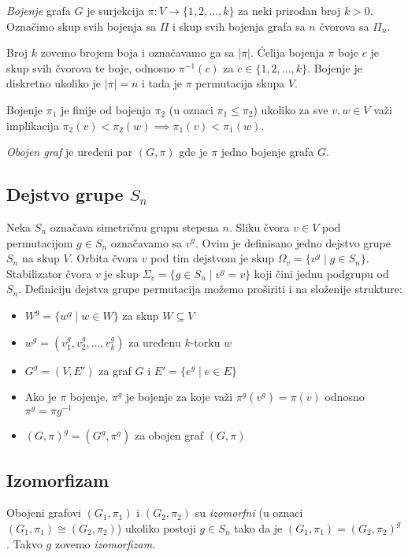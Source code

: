 \documentclass[12pt,oneside]{memoir}
\theoremstyle{definition}
\begin{document}
   \emph{Bojenje} grafa $G$ je surjekcija $\pi : V \to \{1, 2, \dots, k\}$ za
   neki prirodan broj $k > 0$. Označimo skup svih bojenja sa $\Pi$ i skup svih
   bojenja grafa sa $n$ čvorova sa $\Pi_n$.

   Broj $k$ zovemo brojem boja i označavamo ga sa $|\pi|$.  Ćelija bojenja $\pi$
   boje $c$ je skup svih čvorova te boje, odnosno $\pi^{-1}(c)$ za $c \in \{1,
   2, ..., k\}$.  Bojenje je diskretno ukoliko je $|\pi| = n$ i tada je $\pi$
   permutacija skupa $V$.

   Bojenje $\pi_1$ je finije od bojenja $\pi_2$ (u oznaci $\pi_1 \leq \pi_2$)
   ukoliko za sve $v, w \in V$ važi implikacija $\pi_2(v) < \pi_2(w) \implies
   \pi_1(v) < \pi_1(w)$.

   \emph{Obojen graf} je uređeni par $(G, \pi)$ gde je $\pi$ jedno bojenje
   grafa $G$.


   \subsection{Dejstvo grupe $S_n$}

   Neka $S_n$ označava simetričnu grupu stepena $n$. Sliku čvora $v \in V$ pod
   permutacijom $g \in S_n$ označavamo sa $v^g$. Ovim je definisano jedno
   dejstvo grupe $S_n$ na skup $V$. Orbita čvora $v$ pod tim dejstvom je skup
   $\Omega_v = \{ v^g \mid g \in S_n \}$. Stabilizator čvora $v$ je skup
   $\Sigma_v = \{ g \in S_n \mid v^g = v \}$ koji čini jednu podgrupu od $S_n$.
   Definiciju dejstva grupe permutacija možemo proširiti i na složenije
   strukture:
   \begin{itemize}
       \item $W^g = \{w^g \mid w \in W\}$ za skup $W \subseteq V$
       \item $w^g = (v_1^g, v_2^g, \dots, v_k^g)$ za uređenu $k$-torku $w$
       \item $G^g = (V, E')$ za graf $G$ i $E' = \{e^g \mid e \in E\}$
       \item Ako je $\pi$ bojenje, $\pi^g$ je bojenje za koje važi
		   $\pi^g(v^g)=\pi(v)$ odnosno $\pi^g=\pi g^{-1}$
       \item $(G, \pi)^g = (G^g, \pi^g)$ za obojen graf $(G, \pi)$
   \end{itemize}


   \subsection{Izomorfizam}

   Obojeni grafovi $(G_1, \pi_1)$ i $(G_2, \pi_2)$ su \emph{izomorfni} (u oznaci
   $(G_1, \pi_1) \cong (G_2, \pi_2)$) ukoliko postoji $g \in S_n$ tako da je
   $(G_1, \pi_1) = (G_2, \pi_2)^g$. Takvo $g$ zovemo \emph{izomorfizam}.
\end{document}
